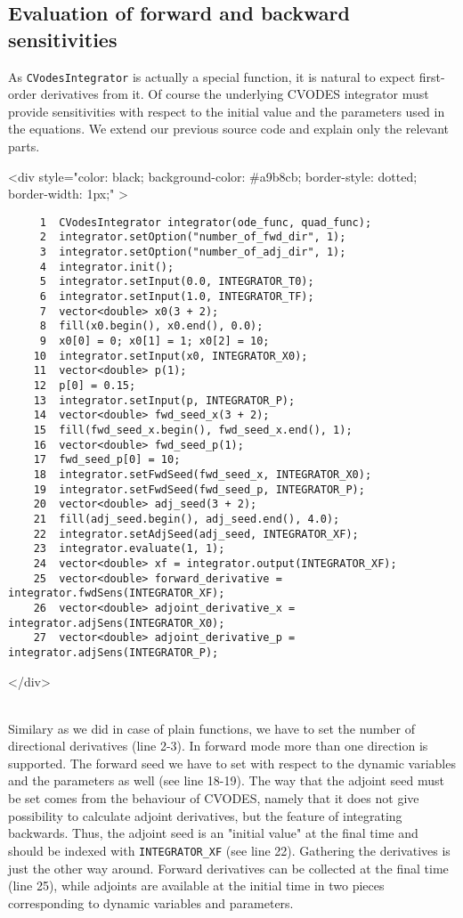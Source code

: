 \documentclass[a4paper,12pt]{book}
\newcommand{\codebegin}{
\begin{rawhtml}
<div style="color: black; background-color: \#a9b8cb;  border-style: dotted; border-width: 1px;" >
\end{rawhtml}
}
\newcommand{\codeend}{
\begin{rawhtml}
</div>
\end{rawhtml}
}
\begin{document}
{\subsection*{Evaluation of forward and backward sensitivities}
As \texttt{CVodesIntegrator} is actually a special function, it is natural to expect first-order derivatives from it. Of course the underlying CVODES integrator must
provide sensitivities with respect to the initial value and the parameters used in the equations. We extend our previous source code and explain only the relevant parts.
\par
\codebegin
\begin{verbatim}
     1  CVodesIntegrator integrator(ode_func, quad_func);
     2  integrator.setOption("number_of_fwd_dir", 1);
     3  integrator.setOption("number_of_adj_dir", 1);
     4  integrator.init();
     5  integrator.setInput(0.0, INTEGRATOR_T0);
     6  integrator.setInput(1.0, INTEGRATOR_TF);
     7  vector<double> x0(3 + 2);
     8  fill(x0.begin(), x0.end(), 0.0);
     9  x0[0] = 0; x0[1] = 1; x0[2] = 10;
    10  integrator.setInput(x0, INTEGRATOR_X0);
    11  vector<double> p(1);
    12  p[0] = 0.15;
    13  integrator.setInput(p, INTEGRATOR_P);
    14  vector<double> fwd_seed_x(3 + 2);
    15  fill(fwd_seed_x.begin(), fwd_seed_x.end(), 1);
    16  vector<double> fwd_seed_p(1);
    17  fwd_seed_p[0] = 10;
    18  integrator.setFwdSeed(fwd_seed_x, INTEGRATOR_X0);
    19  integrator.setFwdSeed(fwd_seed_p, INTEGRATOR_P);
    20  vector<double> adj_seed(3 + 2);
    21  fill(adj_seed.begin(), adj_seed.end(), 4.0);
    22  integrator.setAdjSeed(adj_seed, INTEGRATOR_XF);
    23  integrator.evaluate(1, 1);
    24  vector<double> xf = integrator.output(INTEGRATOR_XF);
    25  vector<double> forward_derivative = integrator.fwdSens(INTEGRATOR_XF);
    26  vector<double> adjoint_derivative_x = integrator.adjSens(INTEGRATOR_X0);
    27  vector<double> adjoint_derivative_p = integrator.adjSens(INTEGRATOR_P);
\end{verbatim}
\codeend\\
Similary as we did in case of plain functions, we have to set the number of directional derivatives (line 2-3). In
forward mode more than one direction is supported. The forward seed we have to set with respect to the dynamic variables and the parameters as well 
(see line 18-19). The way that the adjoint seed must be set comes from the behaviour of CVODES, namely that it does not give possibility to 
calculate adjoint derivatives, but the feature of integrating backwards. Thus, the adjoint seed is an "initial value" at the final time 
and should be indexed with \texttt{INTEGRATOR\_XF} (see line 22). Gathering the derivatives is just the other way around. Forward derivatives can
be collected at the final time (line 25), while adjoints are available at the initial time in two pieces corresponding to dynamic variables and parameters.
}
\end{document}
